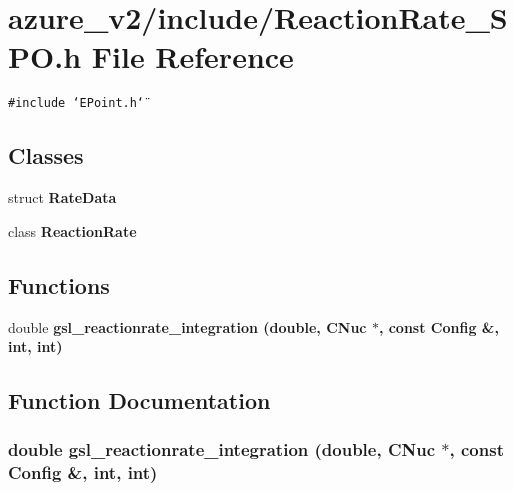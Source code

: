 \section{azure\_\-v2/include/Reaction\-Rate\_\-SPO.h File Reference}
\label{ReactionRate__SPO_8h}
{\tt \#include \char`\"{}EPoint.h\char`\"{}}\par
\subsection*{Classes}
\begin{CompactItemize}
\item 
struct \bf{Rate\-Data}
\item 
class \bf{Reaction\-Rate}
\end{CompactItemize}
\subsection*{Functions}
\begin{CompactItemize}
\item 
double \bf{gsl\_\-reactionrate\_\-integration} (double, \bf{CNuc} $\ast$, const \bf{Config} \&, int, int)
\end{CompactItemize}


\subsection{Function Documentation}
\subsubsection{\setlength{\rightskip}{0pt plus 5cm}double gsl\_\-reactionrate\_\-integration (double, \bf{CNuc} $\ast$, const \bf{Config} \&, int, int)}\label{ReactionRate__SPO_8h_f4b03a26902a7751eb0248d95d5af195}



